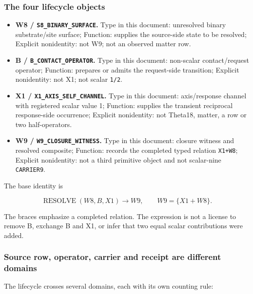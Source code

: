 \subsubsection{The four lifecycle
objects}\label{viii-ch05-the-four-lifecycle-objects}

\begin{itemize}
\tightlist
\item
  \textbf{W8 / \texttt{S8\_BINARY\_SURFACE}.} Type in this document:
  unresolved binary substrate/site surface; Function: supplies the
  source-side state to be resolved; Explicit nonidentity: not W9; not an
  observed matter row.
\item
  \textbf{B / \texttt{B\_CONTACT\_OPERATOR}.} Type in this document:
  non-scalar contact/request operator; Function: prepares or admits the
  request-side transition; Explicit nonidentity: not X1; not scalar
  \texttt{1/2}.
\item
  \textbf{X1 / \texttt{X1\_AXIS\_SELF\_CHANNEL}.} Type in this document:
  axis/response channel with registered scalar value 1; Function:
  supplies the transient reciprocal response-side occurrence; Explicit
  nonidentity: not Theta18, matter, a row or two half-operators.
\item
  \textbf{W9 / \texttt{W9\_CLOSURE\_WITNESS}.} Type in this document:
  closure witness and resolved composite; Function: records the
  completed typed relation \texttt{X1+W8}; Explicit nonidentity: not a
  third primitive object and not scalar-nine \texttt{CARRIER9}.
\end{itemize}

The base identity is

\[
\operatorname{RESOLVE}(W8,B,X1)\longrightarrow W9,
\qquad W9=\{X1+W8\}.
\]

The braces emphasize a completed relation. The expression is not a
license to remove B, exchange B and X1, or infer that two equal scalar
contributions were added.

\subsubsection{Source row, operator, carrier and receipt are different
domains}\label{viii-ch05-source-row-operator-carrier-and-receipt-are-different-domains}

The lifecycle crosses several domains, each with its own counting rule:

